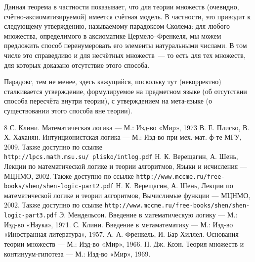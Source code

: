 \documentclass[a4paper,11pt]{article}
\theoremstyle{definition}
\begin{document}
Данная теорема в частности показывает, что для теории множеств (очевидно,
счётно-аксиоматизируемой) имеется счётная модель. В частности, это приводит к
следующему утверждению, называемому парадоксом Сколема: для любого множества,
определимого в аксиоматике Цермело--Френкеля, мы можем предложить способ
перенумеровать его элементы натуральными числами. В том числе это справедливо и
для несчётных множеств~--- то есть для тех множеств, для которых доказано
отсутствие этого способа.

Парадокс, тем не менее, здесь кажущийся, поскольку тут (некорректно) сталкивается
утверждение, формулируемое на предметном языке (об отсутствии способа пересчёта
внутри теории), с утверждением на мета-языке (о существовании этого способа вне
теории).

\begin{thebibliography}{8}
 С. Клини. Математическая логика --- М.: Изд-во «Мир», 1973
 В. Е. Плиско, В. Х. Хаханян. Интуиционистская логика --- М.:
  Изд-во при мех.-мат. ф-те МГУ, 2009. Также доступно по ссылке
  \texttt{http://lpcs.math.msu.su/\string~plisko/intlog.pdf}
 Н. К. Верещагин, А. Шень, Лекции по математической логике и
  теории алгоритмов, Языки и исчисления --- МЦНМО, 2002. Также доступно по
  ссылке \texttt{http://www.mccme.ru/free-books/shen/shen-logic-part2.pdf}
 Н. К. Верещагин, А. Шень, Лекции по математической логике и
  теории алгоритмов, Вычислимые функции --- МЦНМО, 2002. Также доступно по
  ссылке \texttt{http://www.mccme.ru/free-books/shen/shen-logic-part3.pdf}
 Э. Мендельсон. Введение в математическую логику --- М.:
  Изд-во «Наука», 1971.
 С. Клини. Введение в метаматематику --- М.: Изд-во
  «Иностранная литература», 1957.
 А. А. Френкель, И. Бар-Хиллел. Основания теории множеств ---
  М.: Изд-во «Мир», 1966.
 П. Дж. Коэн. Теория множеств и континуум-гипотеза --- М.: Изд-во
  «Мир», 1969.
\end{thebibliography}
\end{document}
